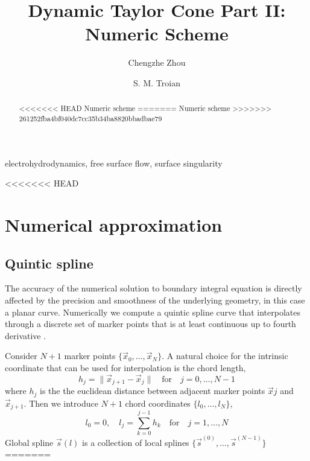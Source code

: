\documentclass{jfm}
\title{Dynamic Taylor Cone Part II: Numeric Scheme}
\author{ Chengzhe Zhou\aff{1}
 \and S. M. Troian\aff{2}   \corresp{\email{stroian@caltech.edu}}}
\affiliation{\aff{1}Division of Physics, Mathematics and Astronomy, California Institute of Technology,
Pasadena, CA 91125, USA
\aff{2}Department of Applied Physics and Materials Science, 
California Institute of Technology,
Pasadena, CA 91125, USA}
\begin{document}
\maketitle
\tableofcontents
\begin{abstract}
<<<<<<< HEAD
Numeric scheme %
=======
Numeric scheme \citep{Taylor64}
>>>>>>> 261252fba4bf040dc7cc35b34ba8820bbadbae79
\end{abstract}

\begin{keywords}
electrohydrodynamics, free surface flow, surface singularity 
\end{keywords}
<<<<<<< HEAD
\section{Numerical approximation}
\subsection{Quintic spline}
The accuracy of the numerical solution to boundary integral equation is directly affected by
the precision and smoothness of the underlying geometry, in this case a planar curve.
Numerically we compute a quintic spline curve that interpolates through a discrete set of marker points
that is at least continuous up to fourth derivative \citep{Mund75}.

Consider $N + 1$ marker points $\{\vec{x}_0,\dots,\vec{x}_{N}\}$.
A natural choice for the intrinsic coordinate that can be used for interpolation
is the chord length,
\begin{equation}
h_j=\|\vec{x}_{j+1}-\vec{x}_{j}\|\quad\textrm{for}\quad j=0,\dots,N-1
\end{equation}
where $h_j$ is the the euclidean distance between adjacent marker points $\vec{x}j$ and $\vec{x}_{j+1}$.
Then we  introduce $N+1$ chord coordinates $\{l_0,\dots,l_N\}$,
\begin{equation}
l_0=0,\quad l_j=\sum_{k=0}^{j-1}h_k\quad\textrm{for}\quad j=1,\dots,N
\end{equation}
Global spline $\vec{s}(l)$ is a collection of local splines $\{\vec{s}^{(0)},\dots,\vec{s}^{(N-1)}\}$
=======
\end{document}
